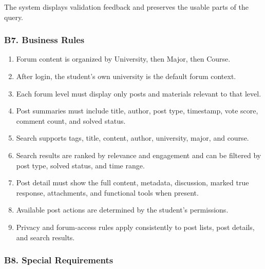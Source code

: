 \documentclass[12pt]{article}
\begin{document}
The system displays validation feedback and preserves the usable parts of the query.
\par\medskip

\hypertarget{sec:b7-business-rules}{}
\subsubsection*{B7. Business Rules}
\par\medskip

\begin{enumerate}
\item Forum content is organized by University, then Major, then Course.
\item After login, the student's own university is the default forum context.
\item Each forum level must display only posts and materials relevant to that level.
\item Post summaries must include title, author, post type, timestamp, vote score, comment count, and solved status.
\item Search supports tags, title, content, author, university, major, and course.
\item Search results are ranked by relevance and engagement and can be filtered by post type, solved status, and time range.
\item Post detail must show the full content, metadata, discussion, marked true response, attachments, and functional tools when present.
\item Available post actions are determined by the student's permissions.
\item Privacy and forum-access rules apply consistently to post lists, post details, and search results.
\end{enumerate}
\par\medskip

\hypertarget{sec:b8-special-requirements}{}
\subsubsection*{B8. Special Requirements}
\par\medskip
\end{document}
